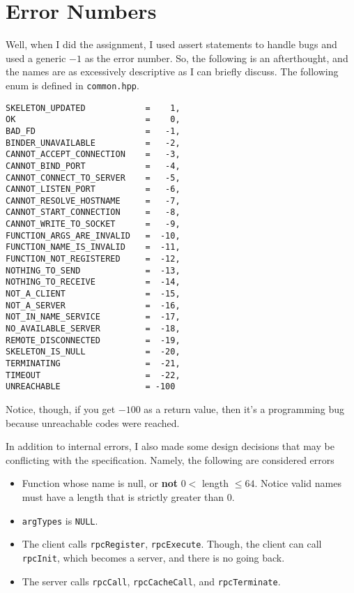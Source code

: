 \section{Error Numbers}
Well, when I did the assignment, I used assert statements to handle bugs and used a generic $-1$ as the error number.
So, the following is an afterthought, and the names are as excessively descriptive as I can briefly discuss.
The following enum is defined in {\tt common.hpp}.

\begin{verbatim}
SKELETON_UPDATED            =    1,
OK                          =    0,
BAD_FD                      =   -1,
BINDER_UNAVAILABLE          =   -2,
CANNOT_ACCEPT_CONNECTION    =   -3,
CANNOT_BIND_PORT            =   -4,
CANNOT_CONNECT_TO_SERVER    =   -5,
CANNOT_LISTEN_PORT          =   -6,
CANNOT_RESOLVE_HOSTNAME     =   -7,
CANNOT_START_CONNECTION     =   -8,
CANNOT_WRITE_TO_SOCKET      =   -9,
FUNCTION_ARGS_ARE_INVALID   =  -10,
FUNCTION_NAME_IS_INVALID    =  -11,
FUNCTION_NOT_REGISTERED     =  -12,
NOTHING_TO_SEND             =  -13,
NOTHING_TO_RECEIVE          =  -14,
NOT_A_CLIENT                =  -15,
NOT_A_SERVER                =  -16,
NOT_IN_NAME_SERVICE         =  -17,
NO_AVAILABLE_SERVER         =  -18,
REMOTE_DISCONNECTED         =  -19,
SKELETON_IS_NULL            =  -20,
TERMINATING                 =  -21,
TIMEOUT                     =  -22,
UNREACHABLE                 = -100
\end{verbatim}

Notice, though, if you get $-100$ as a return value, then it's a programming bug because unreachable codes were reached.

In addition to internal errors, I also made some design decisions that may be conflicting with the specification.
Namely, the following are considered errors
\begin{itemize}
\item
Function whose name is null, or {\bf not} $0 < $ length $\le 64$.
Notice valid names must have a length that is strictly greater than 0.
\item
{\tt argTypes} is {\tt NULL}.
\item
The client calls {\tt rpcRegister}, {\tt rpcExecute}.
Though, the client can call {\tt rpcInit}, which becomes a server, and there is no going back.
\item
The server calls {\tt rpcCall}, {\tt rpcCacheCall}, and {\tt rpcTerminate}.
\end{itemize}
